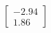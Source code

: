 \documentclass[preview]{standalone}
\begin{document}
\begin{align*}
\begin{bmatrix} -2.94 \\ 1.86 \end{bmatrix}
\end{align*}
\end{document}
